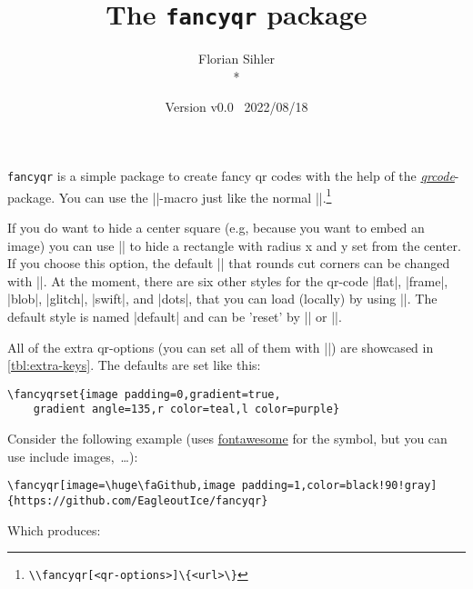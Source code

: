 \documentclass[parskip=half,english,numbers=noenddot,footnotes=nomultiple,oneside]{scrartcl}
\title{The \texttt{fancyqr} package}
\author{%
	\texorpdfstring{Florian Sihler\medskip\\*
		\fancyqr{https://github.com/EagleoutIce/fancyqr}
	}{Florian Sihler}}
\date{Version v0.0 \textendash\ 2022/08/18}
\def\ltx#1{\lstinline/#1/}
\begin{document}
   \maketitle


	\texttt{fancyqr} is a simple package to create fancy qr codes with the help of the \textit{\href{https://www.ctan.org/pkg/qrcode}{qrcode}}-package.
	You can use the |\fancyqr|-macro just like the normal |\qrcode|.\footnote{\ltx{\\fancyqr[<qr-options>]\{<url>\}}}

	If you do want to hide a center square (e.g, because you want to embed an image) you can use || to hide a rectangle with radius x and y set from the center. If you choose this option, the default |\FancyQrRoundCut| that rounds cut corners can be changed with |\FancyQrHardCut|.
	At the moment, there are six other styles for the qr-code |flat|, |frame|, |blob|, |glitch|, |swift|, and |dots|, that you can load (locally) by using ||. The default style is named |default| and can be 'reset' by || or |\FancyLoadDefault|.

	All of the extra qr-options (you can set all of them with ||) are showcased in \autoref{tbl:extra-keys}.
	The defaults are set like this:
\begin{lstlisting}
\fancyqrset{image padding=0,gradient=true,
	gradient angle=135,r color=teal,l color=purple}
\end{lstlisting}
	Consider the following example (uses \href{https://www.ctan.org/pkg/fontawesome}{fontawesome} for the symbol, but you can use include images,~\ldots):
\begin{lstlisting}
\fancyqr[image=\huge\faGithub,image padding=1,color=black!90!gray]{https://github.com/EagleoutIce/fancyqr}
\end{lstlisting}

	\parbox[c]{.3\linewidth}{Which produces:}\hfill\parbox[c]{.4\linewidth}{\raggedleft{}}\par
\end{document}

